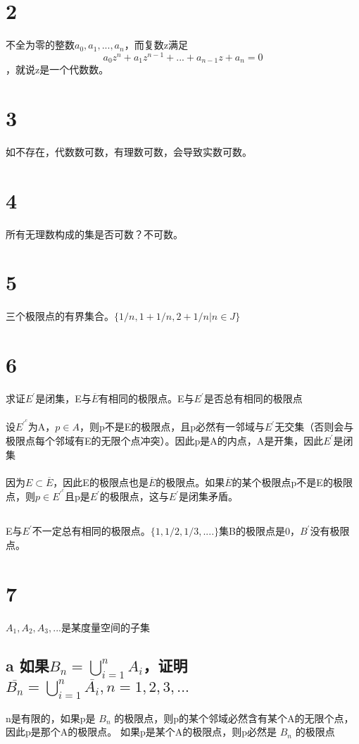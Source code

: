 \section*{2} 不全为零的整数$a_0, a_1, ..., a_n$，而复数z满足 $$ a_0z^n + a_1z^{n-1} + ... + a_{n-1}z + a_n = 0 $$，就说z是一个代数数。
\section*{3} 如不存在，代数数可数，有理数可数，会导致实数可数。
\section*{4} 所有无理数构成的集是否可数？不可数。
\section*{5} 三个极限点的有界集合。$\{ 1/n, 1+1/n, 2+1/n | n\in J \} $
\section*{6} 求证$E^{'}$是闭集，E与$\overline{E}$有相同的极限点。E与$E^{'}$是否总有相同的极限点
\paragraph{} 设$E^{'^c}$为A，$p \in A$，则p不是E的极限点，且p必然有一邻域与$E^{'}$无交集（否则会与极限点每个邻域有E的无限个点冲突）。因此p是A的内点，A是开集，因此$E^{'}$是闭集
\paragraph{} 因为$ E \subset \overline{E} $，因此E的极限点也是$\overline{E}$的极限点。如果$\overline{E}$的某个极限点p不是E的极限点，则$p \in E^{'^c}$且p是$E^{'}$的极限点，这与$E^{'}$是闭集矛盾。
\subsection*{}E与$E^{'}$不一定总有相同的极限点。$\{1, 1/2, 1/3, ....\}$集B的极限点是0，$B^{'}$没有极限点。
\section*{7} $A_1, A_2, A_3, ...$是某度量空间的子集
\subsection*{a 如果$ B_n = \bigcup_{i=1}^n{A_i}$，证明 $\overline{B_n}=\bigcup_{i=1}^n\overline{A_i}, n = 1, 2, 3, ... $ }
n是有限的，如果p是 $B_n $ 的极限点，则p的某个邻域必然含有某个A的无限个点，因此p是那个A的极限点。
如果p是某个A的极限点，则p必然是 $B_n $ 的极限点
